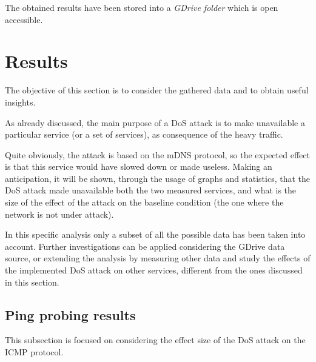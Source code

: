 \documentclass[fleqn, 11pt]{SelfArx} %
\begin{document}
The obtained results have been stored into a {\it{GDrive folder}} \cite{GDrive} which is open accessible.


\section{Results}
The objective of this section is to consider the gathered data and to obtain useful insights. \newline

As already discussed, the main purpose of a DoS attack is to make unavailable a particular service (or a set of services), as consequence of the heavy traffic. \newline

Quite obviously, the attack is based on the mDNS protocol, so the expected effect is that this service would have slowed down or made useless.
Making an anticipation, it will be shown, through the usage of graphs and statistics, that the DoS attack made unavailable both the two measured services, and what is the size of the effect of the attack on the baseline condition (the one where the network is not under attack). \newline

In this specific analysis only a subset of all the possible data has been taken into account.
Further investigations can be applied considering the GDrive data source, or extending the analysis by measuring other data and study the effects of the implemented DoS attack on other services, different from the ones discussed in this section.

\subsection{Ping probing results}
This subsection is focused on considering the effect size of the DoS attack on the ICMP protocol.
\end{document}
